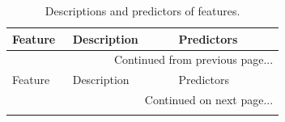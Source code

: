 \clearpage
\singlespacing
\begingroup
  \fontsize{10pt}{12pt}\selectfont
  \begin{longtable}{|p{0.20\linewidth}|p{0.35\linewidth}|p{0.35\linewidth}|}
    \caption{Descriptions and predictors of features.}
    \label{tab::Features} \\
    \hline Feature & Description & Predictors \\ \hline
    \endfirsthead
    
    \hline
    \multicolumn{3}{r}{Continued from previous page...} \\ \hline
    Feature & Description & Predictors \\ \hline
    \endhead
    
    \hline \multicolumn{3}{r}{Continued on next page...} \\ \hline
    \endfoot
    
    \hline
    \endlastfoot
    

\end{longtable}
